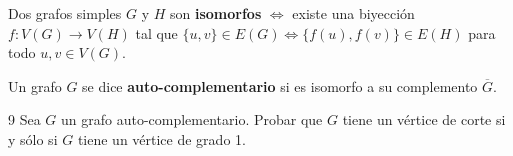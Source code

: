 \begin{definition}
    Dos grafos simples \( G \) y \( H \) son \textbf{isomorfos} \( \iff \) existe una biyección \( f : V(G) \to V(H) \) tal que \( \{u,v\} \in E(G) \iff \{f(u), f(v)\} \in E(H) \) para todo \( u,v \in V(G) \).
\end{definition}

\begin{definition}
    Un grafo \( G \) se dice \textbf{auto-complementario} si es isomorfo a su complemento \( \overline{G} \).
\end{definition}

\begin{ejercicio}{9}
    Sea \( G \) un grafo auto-complementario. Probar que \( G \) tiene un vértice de corte si y sólo si \( G \) tiene un vértice de grado 1.
\end{ejercicio}
